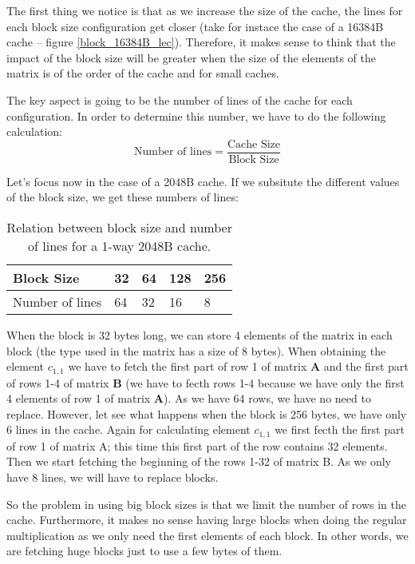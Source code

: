 \documentclass{article}
\begin{document}
The first thing we notice is that as we increase the size of the cache, the lines for each block size configuration get closer (take for instace the case of a 16384B cache -- figure \ref{block_16384B_lec}).  Therefore, it makes sense to think that the impact of the block size will be greater when the size of the elements of the matrix is of the order of the cache and for small caches.

The key aspect is going to be the number of lines of the cache for each configuration. In order to determine this number, we have to do the following calculation: 
\[
\text{Number of lines} = \frac{\text{Cache Size}}{\text{Block Size}}
\]

Let's focus now in the case of a 2048B cache. If we subsitute the different values of the block size, we get these numbers of lines:

{
\begin{table}[!ht]
    \centering
    \begin{tabular}{lllll}
    \hline
    \multicolumn{1}{|l|}{Block Size}      & \multicolumn{1}{l|}{32} & \multicolumn{1}{l|}{64} & \multicolumn{1}{l|}{128} & \multicolumn{1}{l|}{256} \\ \hline
    \multicolumn{1}{|l|}{Number of lines} & \multicolumn{1}{l|}{64} & \multicolumn{1}{l|}{32} & \multicolumn{1}{l|}{16}  & \multicolumn{1}{l|}{8}   \\ \hline                    
    \end{tabular}
    \caption{\label{tab:table-name}Relation between block size and number of lines for a 1-way 2048B cache.}
\end{table}
}


When the block is 32 bytes long, we can store 4 elements of the matrix in each block (the type used in the matrix has a size of 8 bytes). When obtaining the element $c_{1,1}$ we have to fetch the first part of row 1 of matrix $\mathbf{A}$ and the first part of rows 1-4 of matrix $\mathbf{B}$ (we have to fecth rows 1-4 because we have only the first 4 elements of row 1 of matrix $\mathbf{A}$). As we have 64 rows, we have no need to replace. However, let see what happens when the block is 256 bytes, we have only 6 lines in the cache. Again for calculating element $c_{1,1}$ we first fecth the first part of row 1 of matrix A; this time this first part of the row contains 32 elements. Then we start fetching the beginning of the rows 1-32 of matrix B. As we only have 8 lines, we will have to replace blocks. 

So the problem in using big block sizes is that we limit the number of rows in the cache. Furthermore, it makes no sense having large blocks when doing the regular multiplication as we only need the first elements of each block. In other words, we are fetching huge blocks just to use a few bytes of them.
\end{document}
